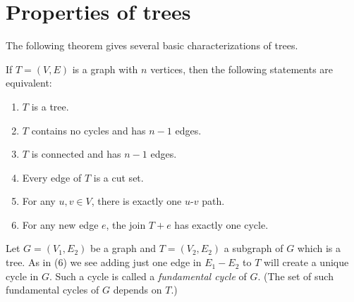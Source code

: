 
\section{Properties of trees}

%

The following theorem gives several basic
characterizations of trees.

\begin{theorem}
If $T = (V, E)$ is a graph with $n$ vertices, then the following
statements are equivalent:
\begin{enumerate}
\item $T$ is a tree.

\item $T$ contains no cycles and has $n - 1$ edges.

\item $T$ is connected and has $n - 1$ edges.

\item Every edge of $T$ is a cut set.

\item For any $u,v \in V$, there is exactly one $u$-$v$ path.

\item For any new edge $e$, the join $T + e$ has exactly one cycle.
\end{enumerate}
\end{theorem}

Let $G=(V_1,E_2)$ be a graph and $T=(V_2,E_2)$ a subgraph of $G$ which is a tree.
As in (6) we see adding just one edge in $E_1-E_2$ to $T$ will create a
unique cycle in $G$. Such a cycle is called a {\it fundamental cycle}
of $G$. (The set of such fundamental cycles of $G$ depends on $T$.)


